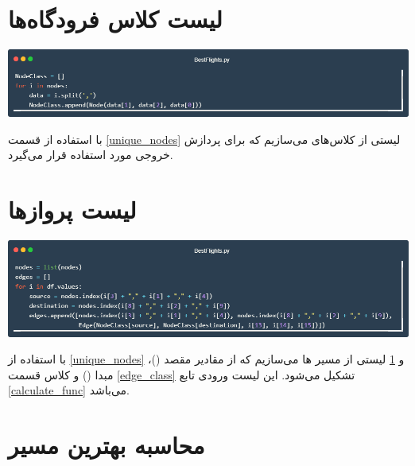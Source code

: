 \documentclass[12pt, dvipsnames, svgnames, x11names,]{article}
\begin{document}
		
	
	\section{لیست کلاس فرودگاه‌ها } \label{node_list}
	
		{\includegraphics[width=14cm]{images/code07}} \par
		{\normalsize با استفاده از قسمت \ref{unique_nodes} لیستی از کلاس‌های  می‌سازیم که برای پردازش خروجی مورد استفاده قرار می‌گیرد.}
	
	


	\section{لیست پروازها} \label{edges_list}

		{\includegraphics[width=14cm]{images/code08}} \par
		{\normalsize با استفاده از \ref{unique_nodes} و \ref{node_list} لیستی از مسیر ها می‌سازیم که از مقادیر مقصد ()، مبدا () و کلاس قسمت \ref{edge_class} تشکیل می‌شود. این لیست ورودی تابع \ref{calculate_func} می‌باشد.}

	


	\section{محاسبه بهترین مسیر} \label{shortest_path_func}
\end{document}
